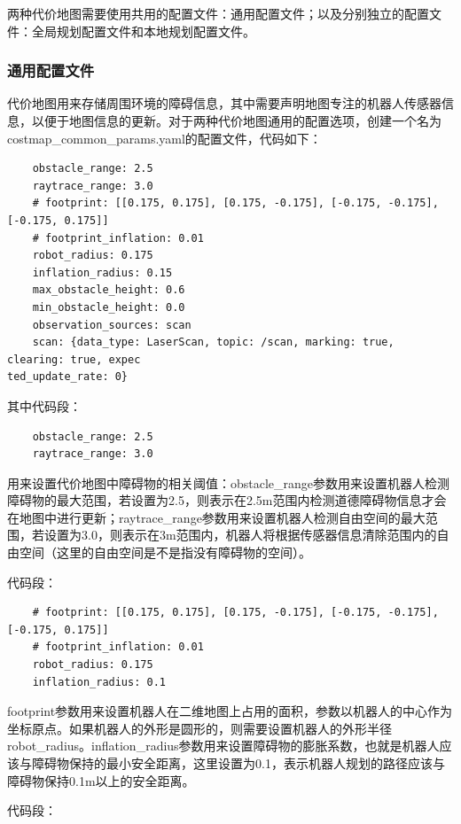 \documentclass[10pt, oneside]{book}
\begin{document}
两种代价地图需要使用共用的配置文件：通用配置文件；以及分别独立的配置文件：全局规划配置文件和本地规划配置文件。

\subsubsection{通用配置文件}

代价地图用来存储周围环境的障碍信息，其中需要声明地图专注的机器人传感器信息，以便于地图信息的更新。对于两种代价地图通用的配置选项，创建一个名为costmap\_common\_params.yaml的配置文件，代码如下：

\begin{verbatim}
    obstacle_range: 2.5
    raytrace_range: 3.0
    # footprint: [[0.175, 0.175], [0.175, -0.175], [-0.175, -0.175], [-0.175, 0.175]]
    # footprint_inflation: 0.01
    robot_radius: 0.175
    inflation_radius: 0.15
    max_obstacle_height: 0.6
    min_obstacle_height: 0.0
    observation_sources: scan
    scan: {data_type: LaserScan, topic: /scan, marking: true, clearing: true, expec
ted_update_rate: 0}
\end{verbatim}

其中代码段：

\begin{verbatim}
    obstacle_range: 2.5
    raytrace_range: 3.0
\end{verbatim}

用来设置代价地图中障碍物的相关阈值：obstacle\_range参数用来设置机器人检测障碍物的最大范围，若设置为2.5，则表示在2.5m范围内检测道德障碍物信息才会在地图中进行更新；raytrace\_range参数用来设置机器人检测自由空间的最大范围，若设置为3.0，则表示在3m范围内，机器人将根据传感器信息清除范围内的自由空间\textcolor[rgb]{1,0,0}{（这里的自由空间是不是指没有障碍物的空间）}。

代码段：

\begin{verbatim}
    # footprint: [[0.175, 0.175], [0.175, -0.175], [-0.175, -0.175], [-0.175, 0.175]]
    # footprint_inflation: 0.01
    robot_radius: 0.175
    inflation_radius: 0.1
\end{verbatim}

footprint参数用来设置机器人在二维地图上占用的面积，参数以机器人的中心作为坐标原点。如果机器人的外形是圆形的，则需要设置机器人的外形半径robot\_radius。inflation\_radius参数用来设置障碍物的膨胀系数，也就是机器人应该与障碍物保持的最小安全距离，这里设置为0.1，表示机器人规划的路径应该与障碍物保持0.1m以上的安全距离。

代码段：
\end{document}
